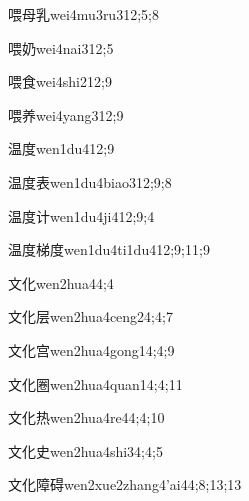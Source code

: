 \begin{verbete}{喂母乳}{wei4mu3ru3}{12;5;8}
\end{verbete}
\begin{verbete}{喂奶}{wei4nai3}{12;5}
\end{verbete}
\begin{verbete}{喂食}{wei4shi2}{12;9}
\end{verbete}
\begin{verbete}{喂养}{wei4yang3}{12;9}
\end{verbete}
\begin{verbete}{温度}{wen1du4}{12;9}
\end{verbete}
\begin{verbete}{温度表}{wen1du4biao3}{12;9;8}
\end{verbete}
\begin{verbete}{温度计}{wen1du4ji4}{12;9;4}
\end{verbete}
\begin{verbete}{温度梯度}{wen1du4ti1du4}{12;9;11;9}
\end{verbete}
\begin{verbete}{文化}{wen2hua4}{4;4}
\end{verbete}
\begin{verbete}{文化层}{wen2hua4ceng2}{4;4;7}
\end{verbete}
\begin{verbete}{文化宫}{wen2hua4gong1}{4;4;9}
\end{verbete}
\begin{verbete}{文化圈}{wen2hua4quan1}{4;4;11}
\end{verbete}
\begin{verbete}{文化热}{wen2hua4re4}{4;4;10}
\end{verbete}
\begin{verbete}{文化史}{wen2hua4shi3}{4;4;5}
\end{verbete}
\begin{verbete}{文化障碍}{wen2xue2zhang4'ai4}{4;8;13;13}
\end{verbete}
